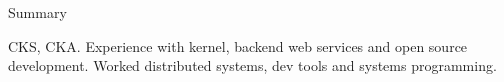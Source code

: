 \documentclass{resume} %
\begin{document}

\begin{rSection}{Summary}
  \begin{rSummarySection}
  {
    \item CKS, CKA. Experience with kernel, backend web services and open source development. Worked distributed systems, dev tools and systems programming.
  }
  \end{rSummarySection}
\end{rSection}

\end{document}
